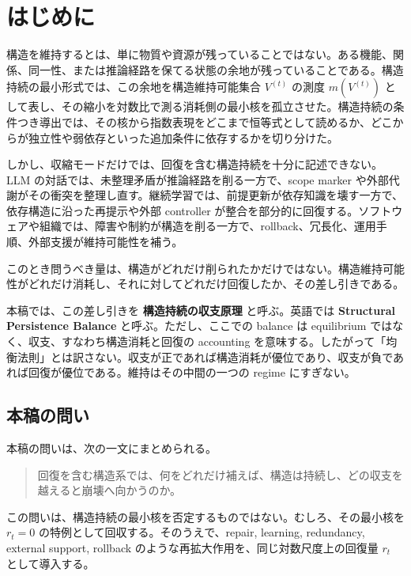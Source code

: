 \documentclass[12pt,a4paper]{article}
\begin{document}
\section{はじめに}\label{ux306fux3058ux3081ux306b}

構造を維持するとは、単に物質や資源が残っていることではない。ある機能、関係、同一性、または推論経路を保てる状態の余地が残っていることである。構造持続の最小形式では、この余地を構造維持可能集合 \(V^{(t)}\) の測度 \(m(V^{(t)})\) として表し、その縮小を対数比で測る消耗側の最小核を孤立させた。構造持続の条件つき導出では、その核から指数表現をどこまで恒等式として読めるか、どこからが独立性や弱依存といった追加条件に依存するかを切り分けた。

しかし、収縮モードだけでは、回復を含む構造持続を十分に記述できない。LLM の対話では、未整理矛盾が推論経路を削る一方で、scope marker や外部代謝がその衝突を整理し直す。継続学習では、前提更新が依存知識を壊す一方で、依存構造に沿った再提示や外部 controller が整合を部分的に回復する。ソフトウェアや組織では、障害や制約が構造を削る一方で、rollback、冗長化、運用手順、外部支援が維持可能性を補う。

このとき問うべき量は、構造がどれだけ削られたかだけではない。構造維持可能性がどれだけ消耗し、それに対してどれだけ回復したか、その差し引きである。

本稿では、この差し引きを \textbf{構造持続の収支原理} と呼ぶ。英語では \textbf{Structural Persistence Balance} と呼ぶ。ただし、ここでの balance は equilibrium ではなく、収支、すなわち構造消耗と回復の accounting を意味する。したがって「均衡法則」とは訳さない。収支が正であれば構造消耗が優位であり、収支が負であれば回復が優位である。維持はその中間の一つの regime にすぎない。

\subsection{本稿の問い}\label{ux672cux7a3fux306eux554fux3044}

本稿の問いは、次の一文にまとめられる。

\begin{quote}
回復を含む構造系では、何をどれだけ補えば、構造は持続し、どの収支を越えると崩壊へ向かうのか。
\end{quote}

この問いは、構造持続の最小核を否定するものではない。むしろ、その最小核を \(r_{t}=0\) の特例として回収する。そのうえで、repair, learning, redundancy, external support, rollback のような再拡大作用を、同じ対数尺度上の回復量 \(r_{t}\) として導入する。
\end{document}
